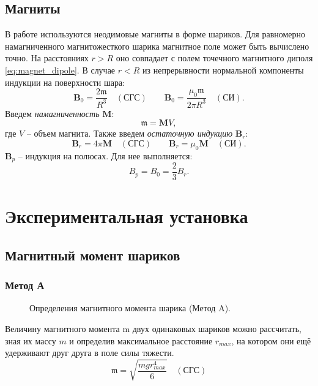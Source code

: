\documentclass[12pt,a4paper]{article}
\begin{document}
	\subsection*{Магниты}
	
	В работе используются неодимовые магниты в форме шариков.
	Для равномерно намагниченного магнитожесткого шарика магнитное поле может быть вычислено точно. На расстояниях $r > R$ оно совпадает с полем точечного магнитного диполя \eqref{eq:magnet_dipole}. В случае $r < R$ из непрерывности нормальной компоненты индукции на поверхности шара:
	$$ \boldsymbol{B}_0 = \frac{2\mathfrak{m}}{R^3} \quad (\text{СГС}) \qquad 
	\boldsymbol{B}_0 = \frac{\mu_0 \mathfrak{m}}{2 \pi R^3} \quad (\text{СИ}). $$
	Введем \textit{намагниченность} $\boldsymbol{M} $:
	$$ \mathfrak{m} = \boldsymbol{M} V,$$
	где $V$ -- объем магнита.
	Также введем \textit{остаточную индукцию} $\boldsymbol{B}_r$:
	$$ \boldsymbol{B}_r = 4 \pi \boldsymbol{M} \quad (\text{СГС}) \qquad
	\boldsymbol{B}_r = \mu_0 \boldsymbol{M} \quad (\text{СИ}). $$
	$\boldsymbol{B}_p$ -- индукция на полюсах. Для нее выполняется:
	$$ B_p = B_0 = \frac{2}{3} B_r. $$
	
	\section*{Экспериментальная установка}
	
	\subsection*{Магнитный момент шариков}
	
	\subsubsection*{Метод А}
	
	\begin{figure}
		\vspace{-60pt}
		\caption{Определения магнитного момента шарика (Метод A).}
		\label{img:method_a}
	\end{figure}
	Величину магнитного момента m двух
	одинаковых шариков можно рассчитать, зная их массу $m$ и определив максимальное расстояние $r_{max}$, на котором они ещё удерживают друг друга в поле силы тяжести.
	$$ \mathfrak{m} = \sqrt{\frac{mgr_{max}^4}{6}} \quad (\text{СГС}) $$
\end{document}
